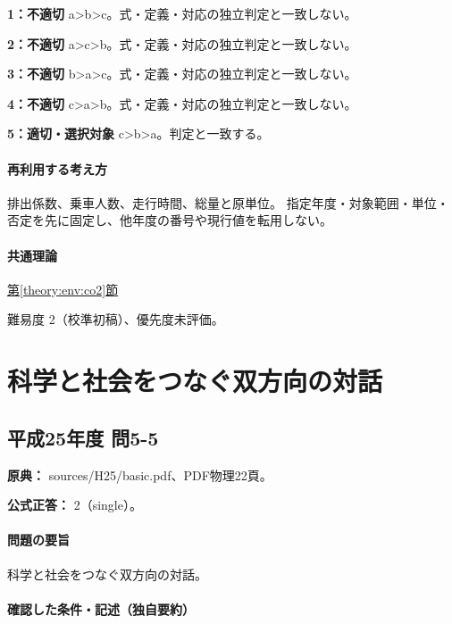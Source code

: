 \noindent\textbf{1：不適切} a>b>c。式・定義・対応の独立判定と一致しない。\par

\noindent\textbf{2：不適切} a>c>b。式・定義・対応の独立判定と一致しない。\par

\noindent\textbf{3：不適切} b>a>c。式・定義・対応の独立判定と一致しない。\par

\noindent\textbf{4：不適切} c>a>b。式・定義・対応の独立判定と一致しない。\par

\noindent\textbf{5：適切・選択対象} c>b>a。判定と一致する。\par

\paragraph{再利用する考え方} 排出係数、乗車人数、走行時間、総量と原単位。 指定年度・対象範囲・単位・否定を先に固定し、他年度の番号や現行値を転用しない。

\paragraph{共通理論} \hyperref[theory:env:co2]{第\ref*{theory:env:co2}節}

\par 難易度 2（校準初稿）、優先度未評価。

\section{科学と社会をつなぐ双方向の対話}

\subsection{平成25年度 問5-5}
\label{q:h25-reg-basic-5-5}

\noindent\textbf{原典：} sources/H25/basic.pdf、PDF物理22頁。

\textbf{公式正答：} 2（single）。

\paragraph{問題の要旨} 科学と社会をつなぐ双方向の対話。

\paragraph{確認した条件・記述（独自要約）}\mbox{}\par

